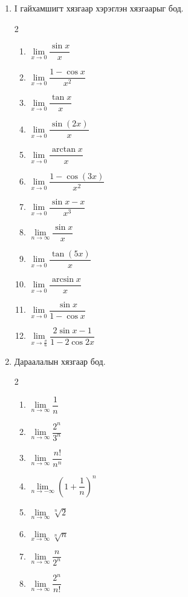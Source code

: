 \begin{enumerate}
\begin{multicols}{2}
\begin{enumerate}
\item $\lim\limits_{x\to 0}\dfrac{\ln(1+2x)}{x}$
\item $\lim\limits_{x\to \infty}\dfrac{\sqrt{x^2+5x}}{x}$
\end{enumerate}
\end{multicols}
\item I гайхамшигт хязгаар хэрэглэн хязгаарыг бод.
\begin{multicols}{2}
\begin{enumerate}
\item $\lim\limits_{x\to 0}\dfrac{\sin x}{x}$
\item $\lim\limits_{x\to 0}\dfrac{1-\cos x}{x^2}$
\item $\lim\limits_{x\to 0}\dfrac{\tan x}{x}$
\item $\lim\limits_{x\to 0}\dfrac{\sin(2x)}{x}$
\item $\lim\limits_{x\to 0}\dfrac{\arctan x}{x}$
\item $\lim\limits_{x\to 0}\dfrac{1-\cos(3x)}{x^2}$
\item $\lim\limits_{x\to 0}\dfrac{\sin x - x}{x^3}$
\item $\lim\limits_{n\to \infty}\dfrac{\sin x}{x}$
\item $\lim\limits_{x\to 0}\dfrac{\tan(5x)}{x}$
\item $\lim\limits_{x\to 0}\dfrac{\arcsin x}{x}$
\item $\lim\limits_{x\to 0}\dfrac{\sin x}{1-\cos x}$
\item $\lim\limits_{x\to \frac{\pi}{6}}\dfrac{2\sin x-1}{1-2\cos 2x}$
\end{enumerate}
\end{multicols}
\item  Дараалалын хязгаар бод.
\begin{multicols}{2}
\begin{enumerate}
\item $\lim\limits_{n\to \infty}\dfrac{1}{n}$
\item $\lim\limits_{n\to \infty}\dfrac{2^n}{3^n}$
\item $\lim\limits_{n\to \infty}\dfrac{n!}{n^n}$
\item $\lim\limits_{n\to -\infty}(1+\dfrac{1}{n})^n$
\item $\lim\limits_{n\to \infty}\sqrt[n]{2}$
\item $\lim\limits_{x\to \infty}\sqrt[n]{n}$
\item $\lim\limits_{n\to \infty}\dfrac{n}{2^n}$
\item $\lim\limits_{n\to \infty}\dfrac{2^n}{n!}$

\end{enumerate}
\end{multicols}
\end{enumerate}
